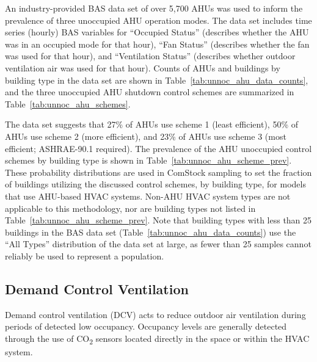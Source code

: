 An industry-provided BAS data set of over 5,700 AHUs was used to inform the prevalence of three unoccupied AHU operation modes. The data set includes time series (hourly) BAS variables for ``Occupied Status'' (describes whether the AHU was in an occupied mode for that hour), ``Fan Status'' (describes whether the fan was used for that hour), and ``Ventilation Status'' (describes whether outdoor ventilation air was used for that hour). Counts of AHUs and buildings by building type in the data set are shown in Table~\ref{tab:unnoc_ahu_data_counts}, and the three unoccupied AHU shutdown control schemes are summarized in Table~\ref{tab:unnoc_ahu_schemes}.

The data set suggests that 27\% of AHUs use scheme 1 (least efficient), 50\% of AHUs use scheme 2 (more efficient), and 23\% of AHUs use scheme 3 (most efficient; ASHRAE-90.1 required). The prevalence of the AHU unoccupied control schemes by building type is shown in Table~\ref{tab:unnoc_ahu_scheme_prev}. These probability distributions are used in ComStock sampling to set the fraction of buildings utilizing the discussed control schemes, by building type, for models that use AHU-based HVAC systems. Non-AHU HVAC system types are not applicable to this methodology, nor are building types not listed in Table~\ref{tab:unnoc_ahu_scheme_prev}. Note that building types with less than 25 buildings in the BAS data set (Table~\ref{tab:unnoc_ahu_data_counts}) use the ``All Types'' distribution of the data set at large, as fewer than 25 samples cannot reliably be used to represent a population.  



\subsection{Demand Control Ventilation}

Demand control ventilation (DCV) acts to reduce outdoor air ventilation during periods of detected low occupancy. Occupancy levels are generally detected through the use of CO\textsubscript{2} sensors located directly in the space or within the HVAC system. 

